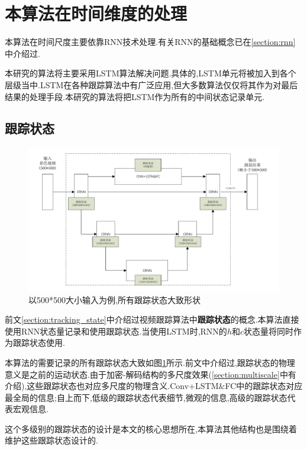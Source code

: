 \section{本算法在时间维度的处理}
\par
本算法在时间尺度主要依靠RNN技术处理.有关RNN的基础概念已在\ref{section:rnn}中介绍过.
\par
本研究的算法将主要采用LSTM算法解决问题.具体的,LSTM单元将被加入到各个层级当中.LSTM在各种跟踪算法中有广泛应用,但大多数算法仅仅将其作为对最后结果的处理手段.本研究的算法将把LSTM作为所有的中间状态记录单元.

\subsection{跟踪状态}
\par
\begin{figure}
    \centering
    \includegraphics[width = 1.\textwidth]{chap/img/tracking_state.pdf}
    \caption{以500*500大小输入为例,所有跟踪状态大致形状}
    \label{fig:tracking_state}
\end{figure}
\par
前文\ref{section:tracking_state}中介绍过视频跟踪算法中\textbf{跟踪状态}的概念.本算法直接使用RNN状态量记录和使用跟踪状态.当使用LSTM时,RNN的$h$和$c$状态量将同时作为跟踪状态使用.
\par
本算法的需要记录的所有跟踪状态大致如图\ref{fig:tracking_state}所示.前文中介绍过,跟踪状态的物理意义是之前的运动状态.由于加密-解码结构的多尺度效果(\ref{section:multiscale}中有介绍),这些跟踪状态也对应多尺度的物理含义.Conv+LSTM\&FC中的跟踪状态对应最全局的信息;自上而下,低级的跟踪状态代表细节,微观的信息,高级的跟踪状态代表宏观信息.
\par
这个多级别的跟踪状态的设计是本文的核心思想所在,本算法其他结构也是围绕着维护这些跟踪状态设计的.

